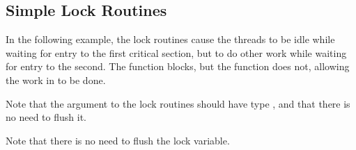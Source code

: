 \subsection{Simple Lock Routines}
\label{subsec:simple_lock}

In the following example, the lock routines cause the threads to be idle while 
waiting for entry to the first critical section, but to do other work while waiting 
for entry to the second. The  function blocks, but the  
function does not, allowing the work in  to be done. 

Note that the argument to the lock routines should have type , 
and that there is no need to flush it. 


Note that there is no need to flush the lock variable. 



